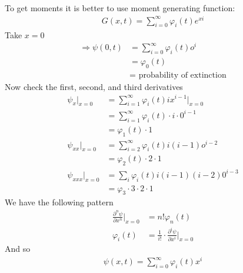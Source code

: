 \documentclass[12pt, letterpaper]{article}
\begin{document}
To get moments it is better to use moment generating function:
\begin{align*}
    G(x,t) = \sum_{i=0}^{\infty} \varphi_i(t) e^{xi}
\end{align*}
Take $x=0$
\begin{align*}
    \Rightarrow\psi(0,t) &= \sum_{i=0}^{\infty} \varphi_i(t) o^i \\
    &= \varphi_0(t) \\
    &= \text{ probability of extinction}
\end{align*}
Now check the first, second, and third derivatives
\begin{align*}
    \psi_x\Big|_{x=0} &= \sum_{i=1}^{\infty} \varphi_i(t)ix^{i-1}\Big|_{x=0} \\
    &= \sum_{i=1}^{\infty}\varphi_i(t)\cdot i \cdot 0^{i-1} \\
    &= \varphi_1(t)\cdot 1 \\
    \psi_{xx} \Big|_{x=0} &= \sum_{i=2}^{\infty}\varphi_i(t)i(i-1)o^{i-2} \\
    &= \varphi_2(t)\cdot 2\cdot 1 \\
    \psi_{xxx} \Big|_{x=0} &= \sum_{i} \varphi_i(t)i(i-1)(i-2)0^{i-3} \\
    &= \varphi_3\cdot 3 \cdot 2 \cdot 1
\end{align*}
We have the following pattern 
\begin{align*}
    \frac{\partial^n \psi}{\partial x^n}\Big|_{x=0} &= n!\varphi_n(t) \\
    \varphi_i(t) &= \frac{1}{i!} \cdot \frac{\partial^i \psi}{\partial x^i}\Big|_{x=0}
\end{align*}
And so 
\begin{align*}
    \psi(x,t) = \sum_{i=0}^{\infty} \varphi_i(t) x^i
\end{align*}
\end{document}
